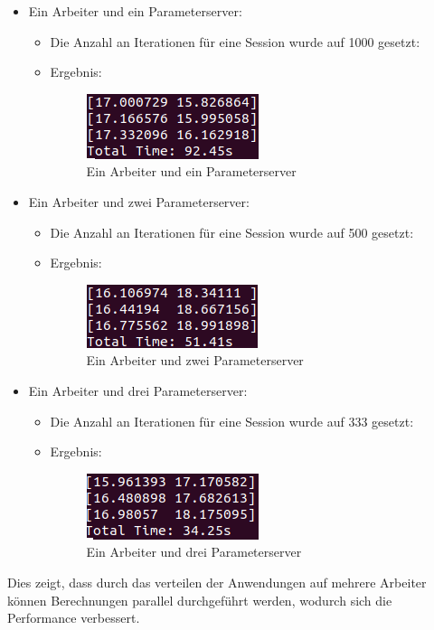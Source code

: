 \begin{itemize}
	\item Ein Arbeiter und ein Parameterserver:
	\begin{itemize}
		\item Die Anzahl an Iterationen für eine Session wurde auf 1000 gesetzt:
		\item Ergebnis:
		\vspace{-2mm}
			\begin{figure}[!h]
				\centering
				\includegraphics[width=0.5\linewidth]{Pictures/1worker1ps}
				\caption{Ein Arbeiter und ein Parameterserver}
				\label{fig:1worker1ps}
			\end{figure}
		\vspace{-5mm}
	\end{itemize}
	\item Ein Arbeiter und zwei Parameterserver:
	\begin{itemize}
		\item Die Anzahl an Iterationen für eine Session wurde auf 500 gesetzt:
		\item Ergebnis:
		\vspace{-2mm}
			\begin{figure}[!h]
				\centering
				\includegraphics[width=0.5\linewidth]{Pictures/2worker1ps}
				\caption{Ein Arbeiter und zwei Parameterserver}
				\label{fig:2worker1ps}
			\end{figure}
		\vspace{-5mm}
	\end{itemize}
	\item Ein Arbeiter und drei Parameterserver:
	\begin{itemize}
		\item Die Anzahl an Iterationen für eine Session wurde auf 333 gesetzt:
		\item Ergebnis:
		\vspace{-2mm}
			\begin{figure}[!h]
				\centering
				\includegraphics[width=0.5\linewidth]{Pictures/3worker1ps}
				\caption{Ein Arbeiter und drei Parameterserver}
				\label{fig:3worker1ps}
			\end{figure}	
		\vspace{-5mm}		
	\end{itemize}
\end{itemize}

Dies zeigt, dass durch das verteilen der Anwendungen auf mehrere Arbeiter können Berechnungen parallel durchgeführt werden, wodurch sich die Performance verbessert.